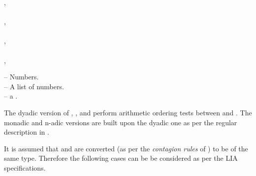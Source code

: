 \documentclass[../Comparisons-Predicates.tex]{subfiles}
\begin{document}
\index{*!\code{<}}
\index{*!\code{<=}}
\index{*!\code{>}}
\index{*!\code{>=}}

\DSyntax{}

\code{<} ,  \RArrow {}\\
\code{<}    \RArrow {}\\
\code{<=} ,  \RArrow {}\\
\code{<=}    \RArrow {}\\
\code{>} ,  \RArrow {}\\
\code{>}    \RArrow {}\\
\code{>=} ,  \RArrow {}\\
\code{>=}    \RArrow {}

\DArgsNValues{}

  -- Numbers.\\
 -- A list of numbers.\\
 -- a .

\DDescription{}

The dyadic version of \code{<}, \code{<=}, \code{>} and \code{>=}
perform arithmetic ordering tests between  and
.  The monadic and n-adic versions are built upon the
dyadic one as per the regular \CL{} description in
\cite{1996:ANSIHyperSpec}.

It is assumed that  and  are converted (as per
the \emph{contagion rules} of \CL{}) to be of the same type.
Therefore the following cases can be be considered as per the LIA
specifications.
\end{document}
